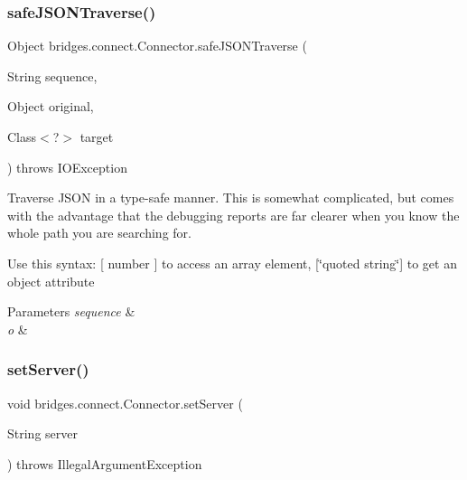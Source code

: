 \mbox{\label{classbridges_1_1connect_1_1_connector_ab7d1d242fbf9acade316650e54a3d020}} 
\subsubsection{\texorpdfstring{safe\+J\+S\+O\+N\+Traverse()}{safeJSONTraverse()}}
{\footnotesize\ttfamily Object bridges.\+connect.\+Connector.\+safe\+J\+S\+O\+N\+Traverse (\begin{DoxyParamCaption}\item[{String}]{sequence,  }\item[{Object}]{original,  }\item[{Class$<$?$>$}]{target }\end{DoxyParamCaption}) throws I\+O\+Exception}

Traverse J\+S\+ON in a type-\/safe manner. This is somewhat complicated, but comes with the advantage that the debugging reports are far clearer when you know the whole path you are searching for.

Use this syntax\+: \mbox{[} number \mbox{]} to access an array element, \mbox{[}\char`\"{}quoted string\char`\"{}\mbox{]} to get an object attribute


\begin{DoxyParams}{Parameters}
{\em sequence} & \\
\hline
{\em o} & \\
\hline
\end{DoxyParams}
\mbox{\label{classbridges_1_1connect_1_1_connector_acab24a8c4ffd3349ec67536552fb30b3}} 
\subsubsection{\texorpdfstring{set\+Server()}{setServer()}}
{\footnotesize\ttfamily void bridges.\+connect.\+Connector.\+set\+Server (\begin{DoxyParamCaption}\item[{String}]{server }\end{DoxyParamCaption}) throws Illegal\+Argument\+Exception}

